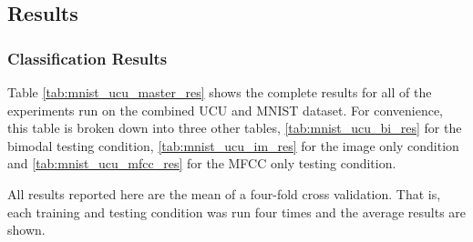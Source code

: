 \begin{table}
	\end{table}




\subsection{Results}

\subsubsection{Classification Results}
Table \ref{tab:mnist_ucu_master_res} shows the complete results for all of the experiments run on the combined UCU and MNIST dataset. For convenience, this table is broken down into three other tables, \ref{tab:mnist_ucu_bi_res} for the bimodal testing condition, \ref{tab:mnist_ucu_im_res} for the image only condition and \ref{tab:mnist_ucu_mfcc_res} for the MFCC only testing condition. 

All results reported here are the mean of a four-fold cross validation. That is, each training and testing condition was run four times and the average results are shown.

